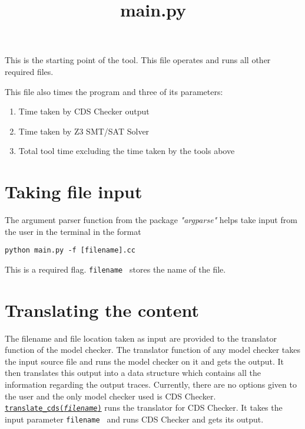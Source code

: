\documentclass{article}
\date{}
\newcommand{\var}[1]{\color{OliveGreen} \texttt{#1}\color{black}}
\newcommand{\fun}[2]{\color{Sepia}\texttt{#1(\color{Gray}\textit{#2}\color{Sepia})}\color{black}}
\begin{document}
\title{main.py}
\maketitle

\par
This is the starting point of the tool. This file operates and runs all other required files.

This file also times the program and three of its parameters:
\begin{enumerate}
    \item Time taken by CDS Checker output
    \item Time taken by Z3 SMT/SAT Solver
    \item Total tool time excluding the time taken by the tools above
\end{enumerate}

\section{Taking file input}
The argument parser function from the package \textit{"argparse"} helps take input from the user in the terminal in the format
\begin{center} \texttt{python main.py -f [filename].cc} \end{center}
This is a required flag.
\newline \newline
\var{filename } stores the  name of the file.

\section{Translating the content}
\par
The filename and file location taken as input are provided to the translator  function of the model checker. The translator function of any model checker takes the input source file and runs the model checker on it and gets the output. It then translates this output into a data structure which contains all the information regarding the output traces. Currently, there are no options given to the user and the only model checker used is CDS Checker.\\

\href{translate\_cds.tex}{\fun{translate\_cds}{filename}} runs the translator for CDS Checker. It takes the input parameter \var{filename } and runs CDS Checker and gets its output.\\
\end{document}
